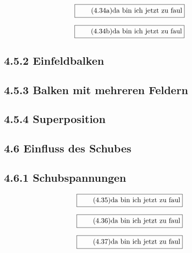 \documentclass[11pt]{article}
\newcommand{\1}{ {\mathds{1}} }
\begin{document}
    \begin{equation}
      \boxed{
        \tag{4.34a}
        \begin{split}
          \text{da bin ich jetzt zu faul}
        \end{split}
      }
    \end{equation}

    \begin{equation}
      \boxed{
        \tag{4.34b}
        \begin{split}
          \text{da bin ich jetzt zu faul}
        \end{split}
      }
    \end{equation}
    
    \subsection*{4.5.2 Einfeldbalken} 
    \subsection*{4.5.3 Balken mit mehreren Feldern}
    \subsection*{4.5.4 Superposition}
    \subsection*{4.6 Einfluss des Schubes}
    \subsection*{4.6.1 Schubspannungen}

    \begin{equation}
      \boxed{
        \tag{4.35}
        \begin{split}
          \text{da bin ich jetzt zu faul}
        \end{split}
      }
    \end{equation}

    \begin{equation}
      \boxed{
        \tag{4.36}
        \begin{split}
          \text{da bin ich jetzt zu faul}
        \end{split}
      }
    \end{equation}

    \begin{equation}
      \boxed{
        \tag{4.37}
        \begin{split}
          \text{da bin ich jetzt zu faul}
        \end{split}
      }
    \end{equation}
\end{document}
